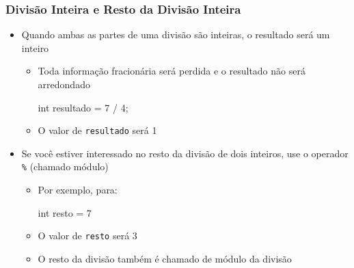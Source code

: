 \documentclass[xcolor={dvipsnames,table},aspectratio=169]{beamer}
\begin{document}
\begin{frame}[fragile]\frametitle{Divisão Inteira e Resto da Divisão Inteira}
\begin{itemize}
	\item Quando ambas as partes de uma divisão são inteiras, o resultado será um inteiro
	\begin{itemize}
		\item Toda informação fracionária será perdida e o resultado não será arredondado
\begin{javacode}
int resultado = 7 / 4;
\end{javacode}
		\item O valor de \texttt{resultado} será 1
	\end{itemize}
	\item Se você estiver interessado no resto da divisão de dois inteiros, use o operador \texttt{\%} (chamado módulo)
	\begin{itemize}
		\item Por exemplo, para:
\begin{javacode}
int resto = 7 %
\end{javacode}
		\item O valor de \texttt{resto} será 3
		\item O resto da divisão também é chamado de módulo da divisão
	\end{itemize}
\end{itemize}
\end{frame}
\end{document}
